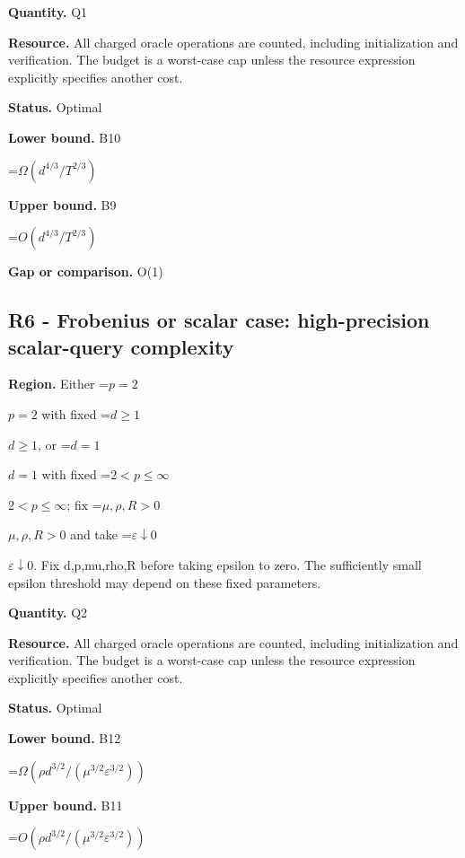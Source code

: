 \documentclass[10pt,a4paper]{article}
\newcommand{\AtlasMath}[1]{\par\begingroup\centering\setbox0=\hbox{$\displaystyle #1$}\ifdim\wd0>1.4\linewidth\typeout{ATLAS WIDE FORMULA: \the\wd0}\fi\ifdim\wd0>\linewidth\resizebox{\linewidth}{!}{\box0}\else\box0\fi\par\endgroup}
\newcommand{\AtlasInlineMath}[1]{\begingroup\setbox0=\hbox{$#1$}\ifdim\wd0>.4\linewidth\endgroup\AtlasMath{#1}\else\endgroup$#1$\fi}
\begin{document}
\textbf{Quantity.} Q1



\textbf{Resource.} All charged oracle operations are counted, including initialization and verification. The budget is a worst-case cap unless the resource expression explicitly specifies another cost.



\textbf{Status.} Optimal



\textbf{Lower bound.} B10



\AtlasMath{\Omega(d^{4/3}/T^{2/3})}


\textbf{Upper bound.} B9



\AtlasMath{O(d^{4/3}/T^{2/3})}


\textbf{Gap or comparison.} O(1)



\subsection{R6 - Frobenius or scalar case: high-precision scalar-query complexity}


\textbf{Region.} Either \AtlasInlineMath{p=2} with fixed \AtlasInlineMath{d\ge1}, or \AtlasInlineMath{d=1} with fixed \AtlasInlineMath{2<p\le\infty}; fix \AtlasInlineMath{\mu,\rho,R>0} and take \AtlasInlineMath{\varepsilon\downarrow0}. Fix d,p,mu,rho,R before taking epsilon to zero. The sufficiently small epsilon threshold may depend on these fixed parameters.



\textbf{Quantity.} Q2



\textbf{Resource.} All charged oracle operations are counted, including initialization and verification. The budget is a worst-case cap unless the resource expression explicitly specifies another cost.



\textbf{Status.} Optimal



\textbf{Lower bound.} B12



\AtlasMath{\Omega(\rho d^{3/2}/(\mu^{3/2}\varepsilon^{3/2}))}


\textbf{Upper bound.} B11



\AtlasMath{O(\rho d^{3/2}/(\mu^{3/2}\varepsilon^{3/2}))}
\end{document}
